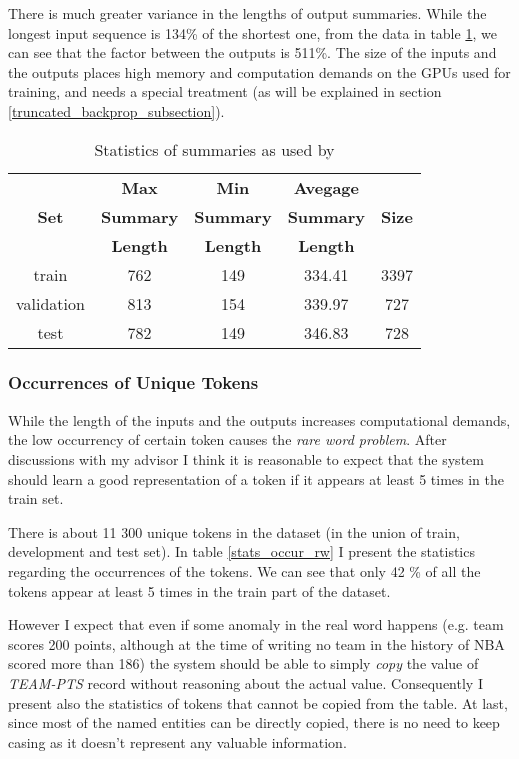 There is much greater variance in the lengths of output summaries. While the longest input sequence is 134\% of the shortest one, from the data in table \ref{stats_sums_orig_rw}, we can see that the factor between the outputs is 511\%. The size of the inputs and the outputs places high memory and computation demands on the GPUs used for training, and needs a special treatment (as will be explained in section \ref{truncated_backprop_subsection}).

\begin{table}[h!]
    \centering
    \begin{tabular}{ccccc}
        \toprule
        {}    & \textbf{Max} & \textbf{Min} & \textbf{Avegage}& {} \\
        \textbf{Set} & \textbf{Summary} & \textbf{Summary} & \textbf{Summary} & \textbf{Size} \\
        {} & \textbf{Length} & \textbf{Length} & \textbf{Length} & {} \\
        \midrule
        train      & 762 & 149 & 334.41 & 3397  \\
        validation & 813 & 154 & 339.97 & 727 \\
        test       & 782 & 149 & 346.83 & 728
    \end{tabular}
    \caption{Statistics of summaries as used by \citep{wiseman2017}} \label{stats_sums_orig_rw}
\end{table}


\subsubsection{Occurrences of Unique Tokens}

While the length of the inputs and the outputs increases computational demands, the low occurrency of certain token causes the \emph{rare word problem}. After discussions with my advisor I think it is reasonable to expect that the system should learn a good representation of a token if it appears at least 5 times in the train set.

There is about 11 300 unique tokens in the dataset (in the union of train, development and test set). In table \ref{stats_occur_rw} I present the statistics regarding the occurrences of the tokens. We can see that only 42 \% of all the tokens appear at least 5 times in the train part of the dataset.

However I expect that even if some anomaly in the real word happens (e.g. team scores 200 points, although at the time of writing no team in the history of NBA scored more than 186) the system should be able to simply \emph{copy} the value of \emph{TEAM-PTS} record without reasoning about the actual value. Consequently I present also the statistics of tokens that cannot be copied from the table. At last, since most of the named entities can be directly copied, there is no need to keep casing as it doesn't represent any valuable information.

